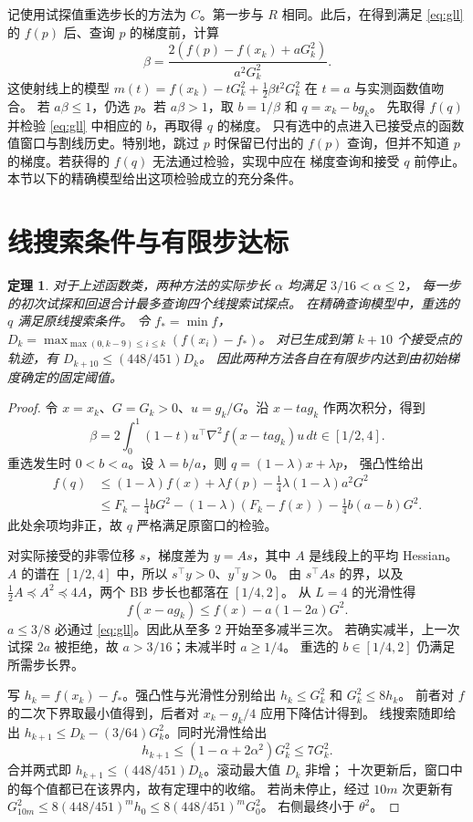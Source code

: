 \documentclass[UTF8,11pt]{ctexart}
\newtheorem{theorem}{定理}
\begin{document}
记使用试探值重选步长的方法为 $C$。第一步与 $R$ 相同。此后，在得到满足
\eqref{eq:gll} 的 $f(p)$ 后、查询 $p$ 的梯度前，计算
\begin{equation}\label{eq:model}
  \beta=\frac{2(f(p)-f(x_k)+aG_k^2)}{a^2G_k^2}.
\end{equation}
这使射线上的模型 $m(t)=f(x_k)-tG_k^2+\frac12\beta t^2G_k^2$ 在 $t=a$ 与实测函数值吻合。
若 $a\beta\le1$，仍选 $p$。若 $a\beta>1$，取 $b=1/\beta$ 和 $q=x_k-bg_k$。
先取得 $f(q)$ 并检验 \eqref{eq:gll} 中相应的 $b$，再取得 $q$ 的梯度。
只有选中的点进入已接受点的函数值窗口与割线历史。特别地，跳过 $p$ 时保留已付出的
$f(p)$ 查询，但并不知道 $p$ 的梯度。若获得的 $f(q)$ 无法通过检验，实现中应在
梯度查询和接受 $q$ 前停止。本节以下的精确模型给出这项检验成立的充分条件。

\section{线搜索条件与有限步达标}
\begin{theorem}\label{thm:finite}
对于上述函数类，两种方法的实际步长 $\alpha$ 均满足 $3/16<\alpha\le2$，
每一步的初次试探和回退合计最多查询四个线搜索试探点。
在精确查询模型中，重选的 $q$ 满足原线搜索条件。
令 $f_*=\min f$，$D_k=\max_{\max(0,k-9)\le i\le k}(f(x_i)-f_*)$。
对已生成到第 $k+10$ 个接受点的轨迹，有 $D_{k+10}\le (448/451)D_k$。
因此两种方法各自在有限步内达到由初始梯度确定的固定阈值。
\end{theorem}
\begin{proof}
令 $x=x_k$、$G=G_k>0$、$u=g_k/G$。沿 $x-ta g_k$ 作两次积分，得到
\[
 \beta=2\int_0^1(1-t)u^\top \nabla^2 f(x-ta g_k)u\,dt\in[1/2,4].
\]
重选发生时 $0<b<a$。设 $\lambda=b/a$，则 $q=(1-\lambda)x+\lambda p$，
强凸性给出
\begin{align*}
 f(q)&\le (1-\lambda)f(x)+\lambda f(p)
             -\tfrac14\lambda(1-\lambda)a^2G^2\\
 &\le F_k-\tfrac14 bG^2
             -(1-\lambda)(F_k-f(x))-\tfrac14 b(a-b)G^2.
\end{align*}
此处余项均非正，故 $q$ 严格满足原窗口的检验。

对实际接受的非零位移 $s$，梯度差为 $y=As$，其中 $A$ 是线段上的平均 Hessian。
$A$ 的谱在 $[1/2,4]$ 中，所以 $s^\top y>0$、$y^\top y>0$。
由 $s^\top A s$ 的界，以及 $\tfrac12 A\preceq A^2\preceq 4A$，两个 BB 步长也都落在 $[1/4,2]$。
从 $L=4$ 的光滑性得
\[
 f(x-ag_k)\le f(x)-a(1-2a)G^2.
\]
$a\le3/8$ 必通过 \eqref{eq:gll}。因此从至多 $2$ 开始至多减半三次。
若确实减半，上一次试探 $2a$ 被拒绝，故 $a>3/16$；未减半时 $a\ge1/4$。
重选的 $b\in[1/4,2]$ 仍满足所需步长界。

写 $h_k=f(x_k)-f_*$。强凸性与光滑性分别给出 $h_k\le G_k^2$ 和 $G_k^2\le8h_k$。
前者对 $f$ 的二次下界取最小值得到，后者对 $x_k-g_k/4$ 应用下降估计得到。
线搜索随即给出 $h_{k+1}\le D_k-(3/64)G_k^2$。同时光滑性给出
\[
 h_{k+1}\le(1-\alpha+2\alpha^2)G_k^2\le7G_k^2.
\]
合并两式即 $h_{k+1}\le(448/451)D_k$。滚动最大值 $D_k$ 非增；
十次更新后，窗口中的每个值都已在该界内，故有定理中的收缩。
若尚未停止，经过 $10m$ 次更新有
$G_{10m}^2\le 8(448/451)^m h_0\le8(448/451)^mG_0^2$。
右侧最终小于 $\theta^2$。
\end{proof}
\end{document}
